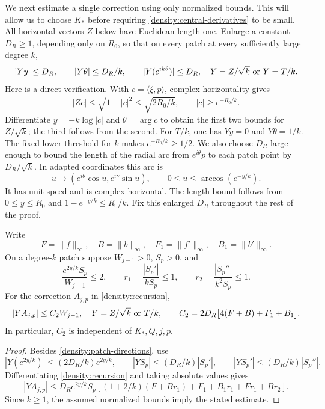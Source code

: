 We next estimate a single correction using only normalized bounds.
This will allow us to choose \(K_*\) before requiring
\eqref{density:central-derivatives} to be small.
All horizontal vectors \(Z\) below have Euclidean length one.
Enlarge a constant \(D_R\ge1\), depending only on \(R_0\), so that
on every patch at every sufficiently large degree \(k\),
\begin{equation}\label{density:patch-directions}
 |Yy|\le D_R,\qquad |Y\theta|\le D_R/k,\qquad
 |Y(e^{ik\theta})|\le D_R,
 \quad Y=Z/\sqrt{k}\ \hbox{or}\ Y=T/k.
\end{equation}
Here is a direct verification.  With \(c=\langle\xi,p\rangle\),
complex horizontality gives
\[
 |Zc|\le\sqrt{1-|c|^2}
 \le\sqrt{2R_0/k},\qquad |c|\ge e^{-R_0/k}.
\]
Differentiate \(y=-k\log|c|\) and \(\theta=\arg c\) to obtain
the first two bounds for \(Z/\sqrt{k}\); the third follows from
the second.  For \(T/k\), one has \(Yy=0\) and \(Y\theta=1/k\).
The fixed lower threshold for \(k\) makes \(e^{-R_0/k}\ge1/2\).
We also choose \(D_R\) large enough to bound the length of the radial
arc from \(e^{i\theta}p\) to each patch point by \(D_R/\sqrt{k}\).
In adapted coordinates this arc is
\[
 u\longmapsto(e^{i\theta}\cos u,e^{i\gamma}\sin u),
 \qquad 0\le u\le \arccos(e^{-y/k}).
\]
It has unit speed and is complex-horizontal.  The length bound follows
from \(0\le y\le R_0\) and \(1-e^{-y/k}\le R_0/k\).
Fix this enlarged \(D_R\) throughout the rest of the proof.

\begin{lemma}
\label{density:normalized-patch}
Write
\[
 F=\|f\|_\infty,\quad B=\|b\|_\infty,\quad
 F_1=\|f'\|_\infty,\quad B_1=\|b'\|_\infty.
\]
On a degree-\(k\) patch suppose \(W_{j-1}>0\), \(S_p>0\), and
\[
 \frac{e^{2y/k}S_p}{W_{j-1}}\le2,\qquad
 r_1=\frac{|S_p'|}{kS_p}\le1,\qquad
 r_2=\frac{|S_p''|}{k^2S_p}\le1.
\]
For the correction \(A_{j,p}\) in \eqref{density:recursion},
\[
 |YA_{j,p}|\le C_2W_{j-1},
 \quad Y=Z/\sqrt{k}\ \hbox{or}\ T/k,
 \qquad
 C_2=2D_R\bigl[4(F+B)+F_1+B_1\bigr].
\]
In particular, \(C_2\) is independent of \(K_*,Q,j,p\).
\end{lemma}

\begin{proof}
Besides \eqref{density:patch-directions}, use
\[
 |Y(e^{2y/k})|\le(2D_R/k)e^{2y/k},\qquad
 |YS_p|\le(D_R/k)|S_p'|,\qquad
 |YS_p'|\le(D_R/k)|S_p''|.
\]
Differentiating \eqref{density:recursion} and taking absolute values gives
\[
 |YA_{j,p}|
 \le D_Re^{2y/k}S_p
 \left[(1+2/k)(F+Br_1)+F_1+B_1r_1+Fr_1+Br_2\right].
\]
Since \(k\ge1\), the assumed normalized bounds imply the stated estimate.
\end{proof}


